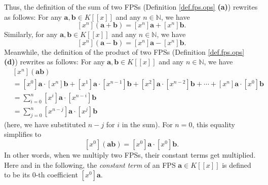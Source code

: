 Thus, the definition of the sum of two FPSs (Definition \ref{def.fps.ops}
\textbf{(a)}) rewrites as follows: For any $\mathbf{a},\mathbf{b}\in K\left[
\left[  x\right]  \right]  $ and any $n\in\mathbb{N}$, we have
\begin{equation}
\left[  x^{n}\right]  \left(  \mathbf{a}+\mathbf{b}\right)  =\left[
x^{n}\right]  \mathbf{a}+\left[  x^{n}\right]  \mathbf{b}.
\label{pf.thm.fps.ring.xn(a+b)=}%
\end{equation}
Similarly, for any $\mathbf{a},\mathbf{b}\in K\left[  \left[  x\right]
\right]  $ and any $n\in\mathbb{N}$, we have
\begin{equation}
\left[  x^{n}\right]  \left(  \mathbf{a}-\mathbf{b}\right)  =\left[
x^{n}\right]  \mathbf{a}-\left[  x^{n}\right]  \mathbf{b}.
\label{pf.thm.fps.ring.xn(a-b)=}%
\end{equation}
Meanwhile, the definition of the product of two FPSs (Definition
\ref{def.fps.ops} \textbf{(d)}) rewrites as follows: For any $\mathbf{a}%
,\mathbf{b}\in K\left[  \left[  x\right]  \right]  $ and any $n\in\mathbb{N}$,
we have
\begin{align}
&  \left[  x^{n}\right]  \left(  \mathbf{ab}\right) \nonumber\\
&  =\left[  x^{0}\right]  \mathbf{a}\cdot\left[  x^{n}\right]  \mathbf{b}%
+\left[  x^{1}\right]  \mathbf{a}\cdot\left[  x^{n-1}\right]  \mathbf{b}%
+\left[  x^{2}\right]  \mathbf{a}\cdot\left[  x^{n-2}\right]  \mathbf{b}%
+\cdots+\left[  x^{n}\right]  \mathbf{a}\cdot\left[  x^{0}\right]
\mathbf{b}\nonumber\\
&  =\sum_{i=0}^{n}\left[  x^{i}\right]  \mathbf{a}\cdot\left[  x^{n-i}\right]
\mathbf{b}\label{pf.thm.fps.ring.xn(ab)=2}\\
&  =\sum_{j=0}^{n}\left[  x^{n-j}\right]  \mathbf{a}\cdot\left[  x^{j}\right]
\mathbf{b} \label{pf.thm.fps.ring.xn(ab)=3}%
\end{align}
(here, we have substituted $n-j$ for $i$ in the sum). For $n=0$, this equality
simplifies to%
\begin{equation}
\left[  x^{0}\right]  \left(  \mathbf{ab}\right)  =\left[  x^{0}\right]
\mathbf{a}\cdot\left[  x^{0}\right]  \mathbf{b}.
\label{pf.thm.fps.ring.x0(ab)=}%
\end{equation}
In other words, when we multiply two FPSs, their constant terms get
multiplied. Here and in the following, the \emph{constant term} of an FPS
$\mathbf{a}\in K\left[  \left[  x\right]  \right]  $ is defined to be its
$0$-th coefficient $\left[  x^{0}\right]  \mathbf{a}$.

